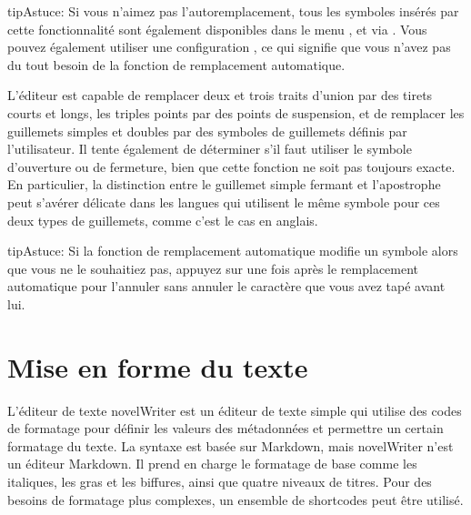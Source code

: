 \documentclass[a4paper,11pt,french]{sphinxmanual}
\begin{document}
\begin{sphinxadmonition}{tip}{Astuce:}
\sphinxAtStartPar
Si vous n’aimez pas l’auto\sphinxhyphen{}remplacement, tous les symboles insérés par cette fonctionnalité sont également disponibles dans le menu , et via {\hyperref[\detokenize{usage_shortcuts:a-kb-ins}]{}}. Vous pouvez également utiliser une configuration , ce qui signifie que vous n’avez pas du tout besoin de la fonction de remplacement automatique.
\end{sphinxadmonition}

\sphinxAtStartPar
L’éditeur est capable de remplacer deux et trois traits d’union par des tirets courts et longs, les triples points par des points de suspension, et de remplacer les guillemets simples et doubles par des symboles de guillemets définis par l’utilisateur. Il tente également de déterminer s’il faut utiliser le symbole d’ouverture ou de fermeture, bien que cette fonction ne soit pas toujours exacte. En particulier, la distinction entre le guillemet simple fermant et l’apostrophe peut s’avérer délicate dans les langues qui utilisent le même symbole pour ces deux types de guillemets, comme c’est le cas en anglais.

\begin{sphinxadmonition}{tip}{Astuce:}
\sphinxAtStartPar
Si la fonction de remplacement automatique modifie un symbole alors que vous ne le souhaitiez pas, appuyez sur  une fois après le remplacement automatique pour l’annuler sans annuler le caractère que vous avez tapé avant lui.
\end{sphinxadmonition}

\sphinxstepscope


\chapter{Mise en forme du texte}
\label{\detokenize{usage_format:formatting-your-text}}\label{\detokenize{usage_format:a-fmt}}\label{\detokenize{usage_format::doc}}
\sphinxAtStartPar
L’éditeur de texte novelWriter est un éditeur de texte simple qui utilise des codes de formatage pour définir les valeurs des métadonnées et permettre un certain formatage du texte. La syntaxe est basée sur Markdown, mais novelWriter n’est  un éditeur Markdown. Il prend en charge le formatage de base comme les italiques, les gras et les biffures, ainsi que quatre niveaux de titres. Pour des besoins de formatage plus complexes, un ensemble de shortcodes peut être utilisé.
\end{document}
